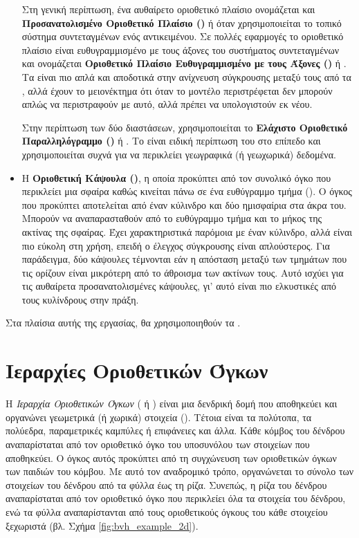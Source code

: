 \begin{itemize}
    Στη γενική περίπτωση, 
    ένα αυθαίρετο οριοθετικό πλαίσιο ονομάζεται και \textbf{Προσανατολισμένο 
    Οριοθετικό Πλαίσιο ()} \textbf{} 
    ή \textbf{} όταν χρησιμοποιείται το τοπικό σύστημα 
    συντεταγμένων ενός αντικειμένου.
    Σε πολλές εφαρμογές το οριοθετικό πλαίσιο είναι ευθυγραμμισμένο με τους 
    άξονες του συστήματος συντεταγμένων και ονομάζεται \textbf{Οριοθετικό 
    Πλαίσιο Ευθυγραμμισμένο με τους Άξονες ()}
    ή \textbf{}. 
    Τα  είναι πιο απλά και αποδοτικά στην ανίχνευση 
    σύγκρουσης μεταξύ τους από τα , αλλά έχουν το μειονέκτημα ότι 
    όταν το μοντέλο  περιστρέφεται δεν μπορούν απλώς να περιστραφούν με αυτό, 
    αλλά πρέπει να υπολογιστούν εκ νέου. 

    Στην περίπτωση των δύο διαστάσεων, χρησιμοποιείται το 
    \textbf{Ελάχιστο Οριοθετικό Παραλληλόγραμμο ()}
    ή . Το  είναι ειδική περίπτωση του  στο 
    επίπεδο και χρησιμοποιείται συχνά για να περικλείει γεωγραφικά (ή γεωχωρικά)
    δεδομένα.

    \item H \textbf{Οριοθετική Κάψουλα ()}, 
    η οποία προκύπτει από τον συνολικό όγκο που περικλείει μια σφαίρα 
    καθώς κινείται πάνω σε ένα ευθύγραμμο τμήμα (). 
    Ο όγκος που προκύπτει αποτελείται από έναν κύλινδρο και δύο 
    ημισφαίρια στα άκρα του.
    Μπορούν να αναπαρασταθούν από το ευθύγραμμο τμήμα και το μήκος 
    της ακτίνας της σφαίρας.
    Έχει χαρακτηριστικά παρόμοια με έναν κύλινδρο, αλλά είναι πιο εύκολη 
    στη χρήση, επειδή ο έλεγχος σύγκρουσης είναι απλούστερος.
    Για παράδειγμα, δύο κάψουλες τέμνονται εάν η απόσταση μεταξύ των τμημάτων
    που τις ορίζουν είναι μικρότερη από το άθροισμα των ακτίνων τους.
    Αυτό ισχύει για τις αυθαίρετα προσανατολισμένες κάψουλες, γι' 
    αυτό είναι πιο ελκυστικές από τους κυλίνδρους στην πράξη.
\end{itemize}

Στα πλαίσια αυτής της εργασίας, θα χρησιμοποιηθούν τα .

\section{Ιεραρχίες Οριοθετικών Όγκων}
\label{sec:bvh}
H \textit{Ιεραρχία Οριοθετικών Όγκων} (
ή ) είναι μια δενδρική δομή που αποθηκεύει και οργανώνει 
γεωμετρικά (ή χωρικά) στοιχεία (). 
Τέτοια είναι τα πολύτοπα, 
τα πολύεδρα, παραμετρικές καμπύλες ή επιφάνειες και άλλα. 
Κάθε κόμβος του δένδρου αναπαρίσταται από τον οριοθετικό όγκο του
υποσυνόλου των στοιχείων που αποθηκεύει. 
Ο όγκος αυτός προκύπτει από τη συγχώνευση των οριοθετικών όγκων των παιδιών 
του κόμβου.
Με αυτό τον αναδρομικό τρόπο, οργανώνεται το σύνολο των στοιχείων του 
δένδρου από τα φύλλα έως τη ρίζα.
Συνεπώς, η ρίζα του δένδρου αναπαρίσταται από τον οριοθετικό όγκο που περικλείει 
όλα τα στοιχεία του δένδρου, ενώ τα φύλλα αναπαρίστανται από τους οριοθετικούς
όγκους του κάθε στοιχείου ξεχωριστά (βλ. Σχήμα \ref{fig:bvh_example_2d}).


